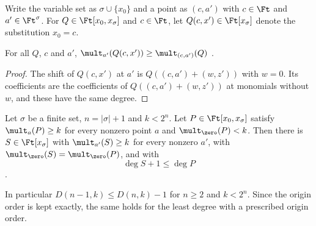 Write the variable set as \(\sigma\cup\{x_0\}\) and a point as \((c,a')\) with
\(c\in\Ft\) and \(a'\in\Ft^\sigma\). For \(Q\in\Ft[x_0,x_\sigma]\) and \(c\in\Ft\), let
\(Q(c,x')\in\Ft[x_\sigma]\) denote the substitution \(x_0=c\).

\begin{lemma}\label{lem:restrict}
For all \(Q\), \(c\) and \(a'\), \(\mult_{a'}(Q(c,x'))\ge\mult_{(c,a')}(Q)\)
.
\end{lemma}

\begin{proof}
The shift of \(Q(c,x')\) at \(a'\) is \(Q((c,a')+(w,z'))\) with \(w=0\). Its
coefficients are the coefficients of \(Q((c,a')+(w,z'))\) at monomials without
\(w\), and these have the same degree.
\end{proof}

\begin{theorem}\label{thm:step}
Let \(\sigma\) be a finite set, \(n=|\sigma|+1\) and \(k<2^n\). Let
\(P\in\Ft[x_0,x_\sigma]\) satisfy \(\mult_a(P)\ge k\) for every nonzero point \(a\)
and \(\mult_{\zero}(P)<k\). Then there is \(S\in\Ft[x_\sigma]\) with
\(\mult_{a'}(S)\ge k\) for every nonzero \(a'\), with
\(\mult_{\zero}(S)=\mult_{\zero}(P)\), and with
\[
 \deg S+1\le\deg P
\]
.
\end{theorem}

In particular \(D(n-1,k)\le D(n,k)-1\) for \(n\ge2\) and \(k<2^n\). Since the
origin order is kept exactly, the same holds for the least degree with a
prescribed origin order.

